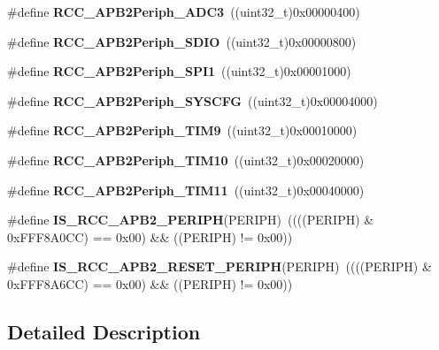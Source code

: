 \begin{DoxyCompactItemize}
\#define {\bfseries R\+C\+C\+\_\+\+A\+P\+B2\+Periph\+\_\+\+A\+D\+C3}~((uint32\+\_\+t)0x00000400)
\item 
\mbox{\label{group___r_c_c___a_p_b2___peripherals_ga1349ee7f3bca5e78a66d005c4d69ffb6}} 
\#define {\bfseries R\+C\+C\+\_\+\+A\+P\+B2\+Periph\+\_\+\+S\+D\+IO}~((uint32\+\_\+t)0x00000800)
\item 
\mbox{\label{group___r_c_c___a_p_b2___peripherals_ga289cc086580f4b6a080ea0ed3dd4a7af}} 
\#define {\bfseries R\+C\+C\+\_\+\+A\+P\+B2\+Periph\+\_\+\+S\+P\+I1}~((uint32\+\_\+t)0x00001000)
\item 
\mbox{\label{group___r_c_c___a_p_b2___peripherals_ga880f2dc5318286b7fe22f7d1cca117dd}} 
\#define {\bfseries R\+C\+C\+\_\+\+A\+P\+B2\+Periph\+\_\+\+S\+Y\+S\+C\+FG}~((uint32\+\_\+t)0x00004000)
\item 
\mbox{\label{group___r_c_c___a_p_b2___peripherals_ga24d0145dc172bc27ed580770cf15e4d9}} 
\#define {\bfseries R\+C\+C\+\_\+\+A\+P\+B2\+Periph\+\_\+\+T\+I\+M9}~((uint32\+\_\+t)0x00010000)
\item 
\mbox{\label{group___r_c_c___a_p_b2___peripherals_ga75069120ecbe86920b39c2b75c909438}} 
\#define {\bfseries R\+C\+C\+\_\+\+A\+P\+B2\+Periph\+\_\+\+T\+I\+M10}~((uint32\+\_\+t)0x00020000)
\item 
\mbox{\label{group___r_c_c___a_p_b2___peripherals_gaba591104f4e31b1e8ce98c269035850f}} 
\#define {\bfseries R\+C\+C\+\_\+\+A\+P\+B2\+Periph\+\_\+\+T\+I\+M11}~((uint32\+\_\+t)0x00040000)
\item 
\mbox{\label{group___r_c_c___a_p_b2___peripherals_ga89a2b95e60e90a51b26b53cc4c0e7b14}} 
\#define {\bfseries I\+S\+\_\+\+R\+C\+C\+\_\+\+A\+P\+B2\+\_\+\+P\+E\+R\+I\+PH}(P\+E\+R\+I\+PH)~((((P\+E\+R\+I\+PH) \& 0x\+F\+F\+F8\+A0\+C\+C) == 0x00) \&\& ((\+P\+E\+R\+I\+P\+H) != 0x00))
\item 
\mbox{\label{group___r_c_c___a_p_b2___peripherals_ga91ecddb4dcb7a07da7178e7f9ba585c7}} 
\#define {\bfseries I\+S\+\_\+\+R\+C\+C\+\_\+\+A\+P\+B2\+\_\+\+R\+E\+S\+E\+T\+\_\+\+P\+E\+R\+I\+PH}(P\+E\+R\+I\+PH)~((((P\+E\+R\+I\+PH) \& 0x\+F\+F\+F8\+A6\+C\+C) == 0x00) \&\& ((\+P\+E\+R\+I\+P\+H) != 0x00))
\end{DoxyCompactItemize}


\subsection{Detailed Description}
